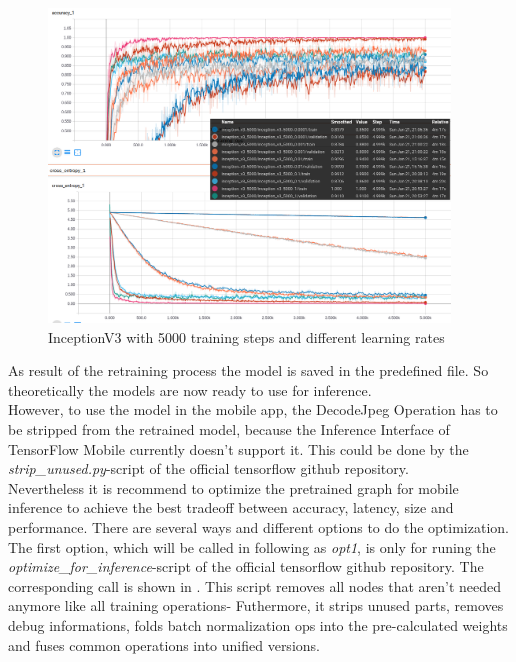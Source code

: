 \begin{figure}[htbp]
\centering
\includegraphics[width=0.95\textwidth]{includes/inception5000LR}
\caption[InceptionV3 with 5000 training steps and different learning rates]{InceptionV3 with 5000 training steps and different learning rates}
\label{fig:inception5000LR}
\end{figure}

As result of the retraining process the model is saved in the predefined file. So theoretically the models are now ready to use for inference. \\

However, to use the model in the mobile app, the DecodeJpeg Operation has to be stripped from the retrained model, because the Inference Interface of TensorFlow Mobile currently doesn't support it. This could be done by the \textit{strip_unused.py}-script of the official tensorflow github repository. \\

Nevertheless it is recommend to optimize the pretrained graph for mobile inference to achieve the best tradeoff between accuracy, latency, size and performance. There are several ways and different options to do the optimization. \\

The first option, which will be called in following as \textit{opt1}, is only for runing the \textit{optimize_for_inference}-script of the official tensorflow github repository. The corresponding call is shown in .
This script removes all nodes that aren't needed anymore like all training operations- Futhermore, it strips unused parts, removes debug informations, folds batch normalization ops into the pre-calculated weights and fuses common operations into unified versions.\\
 
